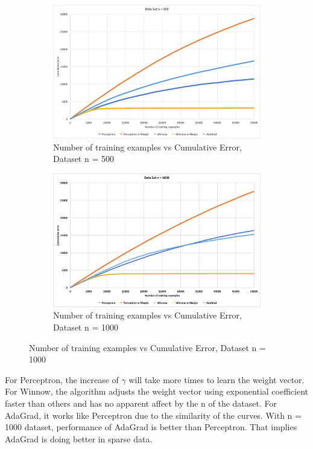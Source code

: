\clearpage
\begin{center}
\begin{figure}%
  \begin{subfigure}{0.49\textwidth}
    \includegraphics[width = \textwidth]{n500.png}
    \caption{Number of training examples vs Cumulative Error, Dataset n = 500}
    \label{fig:left}
  \end{subfigure}
  \begin{subfigure}{0.49\textwidth}
    \includegraphics[width = \textwidth]{n1000.png}
    \caption{Number of training examples vs Cumulative Error, Dataset n = 1000}
    \label{fig:right}
  \end{subfigure}
\end{figure}
\end{center}
For Perceptron, the increase of $\gamma$ will take more times to learn the weight vector.  
For Winnow, the algorithm adjusts the weight vector using exponential coefficient faster than others and has no apparent affect by the n of the dataset.
For AdaGrad, it works like Perceptron due to the similarity of the curves. With n = 1000 dataset, performance of AdaGrad is better than Perceptron. That implies AdaGrad is doing better in sparse data.  